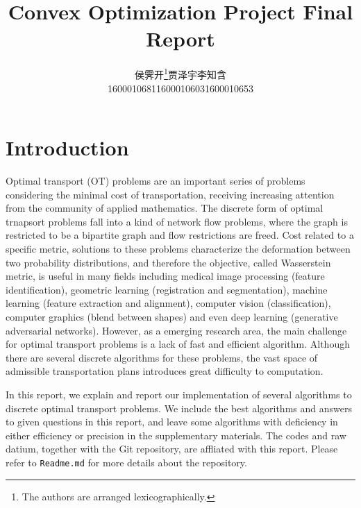 \documentclass[english]{pkupaper}
\newcommand{\titlemark}{Convex Optimization Project Final Report}
\begin{document}
\DeclareRobustCommand{\authorthing}{%
\begin{tabular}{ccc}%
侯霁开\thanks{The authors are arranged lexicographically.} & 贾泽宇\thanksmark{1} & 李知含\thanksmark{1}\\%
1600010681 & 1600010603 & 1600010653%
\end{tabular}%
}
\title{\titlemark}
\author{\authorthing}

\maketitle

\section{Introduction} \label{Sec:Intro}

Optimal transport (OT) problems are an important series of problems considering the minimal cost of transportation, receiving increasing attention from the community of applied mathematics. The discrete form of optimal trnapsort problems fall into a kind of network flow problems, where the graph is restricted to be a bipartite graph and flow restrictions are freed. Cost related to a specific metric, solutions to these problems characterize the deformation between two probability distributions, and therefore the objective, called Wasserstein metric, is useful in many fields including medical image processing (feature identification), geometric learning (registration and segmentation), machine learning (feature extraction and alignment), computer vision (classification), computer graphics (blend between shapes) and even deep learning (generative adversarial networks). However, as a emerging research area, the main challenge for optimal transport problems is a lack of fast and efficient algorithm. Although there are several discrete algorithms \parencite{Bertsekas1992} \parencite{Schrieber2017} for these problems, the vast space of admissible transportation plans introduces great difficulty to computation.

In this report, we explain and report our implementation of several algorithms to discrete optimal transport problems. We include the best algorithms and answers to given questions in this report, and leave some algorithms with deficiency in either efficiency or precision in the supplementary materials. The codes and raw datium, together with the Git repository, are affliated with this report. Please refer to \verb"Readme.md" for more details about the repository.
\end{document}
